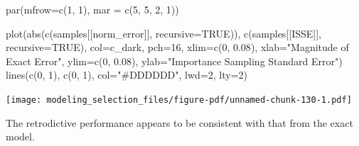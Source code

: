 \documentclass[
  letterpaper,
  DIV=11,
  numbers=noendperiod]{scrartcl}
\newenvironment{Shaded}{\begin{snugshade}}{\end{snugshade}}
\newcommand{\AttributeTok}[1]{\textcolor[rgb]{0.40,0.45,0.13}{#1}}
\newcommand{\ConstantTok}[1]{\textcolor[rgb]{0.56,0.35,0.01}{#1}}
\newcommand{\DecValTok}[1]{\textcolor[rgb]{0.68,0.00,0.00}{#1}}
\newcommand{\FloatTok}[1]{\textcolor[rgb]{0.68,0.00,0.00}{#1}}
\newcommand{\FunctionTok}[1]{\textcolor[rgb]{0.28,0.35,0.67}{#1}}
\newcommand{\NormalTok}[1]{\textcolor[rgb]{0.00,0.23,0.31}{#1}}
\newcommand{\StringTok}[1]{\textcolor[rgb]{0.13,0.47,0.30}{#1}}
\begin{document}
\begin{Shaded}
\begin{Highlighting}[]
\FunctionTok{par}\NormalTok{(}\AttributeTok{mfrow=}\FunctionTok{c}\NormalTok{(}\DecValTok{1}\NormalTok{, }\DecValTok{1}\NormalTok{), }\AttributeTok{mar =} \FunctionTok{c}\NormalTok{(}\DecValTok{5}\NormalTok{, }\DecValTok{5}\NormalTok{, }\DecValTok{2}\NormalTok{, }\DecValTok{1}\NormalTok{))}

\FunctionTok{plot}\NormalTok{(}\FunctionTok{abs}\NormalTok{(}\FunctionTok{c}\NormalTok{(samples[[}\StringTok{\textquotesingle{}norm\_error\textquotesingle{}}\NormalTok{]], }\AttributeTok{recursive=}\ConstantTok{TRUE}\NormalTok{)),}
     \FunctionTok{c}\NormalTok{(samples[[}\StringTok{\textquotesingle{}ISSE\textquotesingle{}}\NormalTok{]], }\AttributeTok{recursive=}\ConstantTok{TRUE}\NormalTok{),}
     \AttributeTok{col=}\NormalTok{c\_dark, }\AttributeTok{pch=}\DecValTok{16}\NormalTok{,}
     \AttributeTok{xlim=}\FunctionTok{c}\NormalTok{(}\DecValTok{0}\NormalTok{, }\FloatTok{0.08}\NormalTok{), }\AttributeTok{xlab=}\StringTok{"Magnitude of Exact Error"}\NormalTok{,}
     \AttributeTok{ylim=}\FunctionTok{c}\NormalTok{(}\DecValTok{0}\NormalTok{, }\FloatTok{0.08}\NormalTok{), }\AttributeTok{ylab=}\StringTok{"Importance Sampling Standard Error"}\NormalTok{)}
\FunctionTok{lines}\NormalTok{(}\FunctionTok{c}\NormalTok{(}\DecValTok{0}\NormalTok{, }\DecValTok{1}\NormalTok{), }\FunctionTok{c}\NormalTok{(}\DecValTok{0}\NormalTok{, }\DecValTok{1}\NormalTok{), }\AttributeTok{col=}\StringTok{"\#DDDDDD"}\NormalTok{, }\AttributeTok{lwd=}\DecValTok{2}\NormalTok{, }\AttributeTok{lty=}\DecValTok{2}\NormalTok{)}
\end{Highlighting}
\end{Shaded}

\texttt{[image: modeling\_selection\_files/figure-pdf/unnamed-chunk-130-1.pdf]}

The retrodictive performance appears to be consistent with that from the
exact model.
\end{document}
